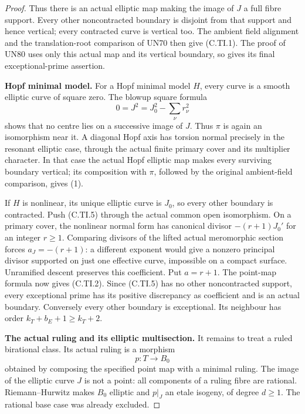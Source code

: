 \begin{proof}
Thus there is an actual elliptic map making
the image of \(J\) a full fibre support.
Every other noncontracted boundary is disjoint
from that support and hence vertical; every
contracted curve is vertical too. The ambient
field alignment and the translation-root
comparison of UN70 then give (C.TI.1).
The proof of UN80 uses only this actual map
and its vertical boundary, so gives its final
exceptional-prime assertion.

\par\medskip\noindent\textbf{Hopf minimal model.}
For a Hopf minimal model \(H\), every curve
is a smooth elliptic curve of square zero.
The blowup square formula
\[
                  0=J^2=J_0^2-\sum_\nu r_\nu^2
 \tag{C.TI.8}
\]
shows that no centre lies on a successive
image of \(J\). Thus \(\pi\) is again an
isomorphism near it. A diagonal Hopf axis
has torsion normal precisely in the resonant
elliptic case, through the actual finite
primary cover and its multiplier character.
In that case the actual Hopf elliptic map
makes every surviving boundary vertical;
its composition with \(\pi\), followed by
the original ambient-field comparison,
gives (1).

If \(H\) is nonlinear, its unique elliptic
curve is \(J_0\), so every other boundary
is contracted. Push (C.TI.5) through the
actual common open isomorphism. On a
primary cover, the nonlinear normal form
has canonical divisor \(-(r+1)J_0'\) for
an integer \(r\ge1\). Comparing divisors
of the lifted actual meromorphic section
forces \(a_J=-(r+1)\): a different exponent
would give a nonzero principal divisor
supported on just one effective curve,
impossible on a compact surface. Unramified
descent preserves this coefficient. Put
\(a=r+1\). The point-map formula now gives
(C.TI.2). Since (C.TI.5) has no other
noncontracted support, every exceptional
prime has its positive discrepancy as
coefficient and is an actual boundary.
Conversely every other boundary is
exceptional. Its neighbour has order
\(k_T+b_E+1\ge k_T+2\).

\par\medskip\noindent\textbf{The actual ruling and its elliptic multisection.}
It remains to treat a ruled birational
class. Its actual ruling is a morphism
\[
                       p:T\longrightarrow B_0
 \tag{C.TI.9}
\]
obtained by composing the specified point
map with a minimal ruling. The image of
the elliptic curve \(J\) is not a point:
all components of a ruling fibre are
rational. Riemann--Hurwitz makes \(B_0\)
elliptic and \(p|_J\) an etale isogeny,
of degree \(d\ge1\). The rational base
case was already excluded.


\end{proof}
